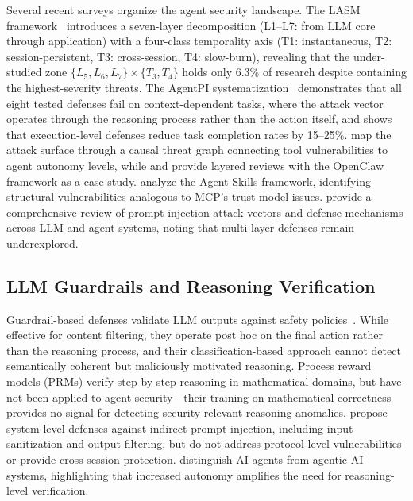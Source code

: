 Several recent surveys organize the agent security landscape. The LASM framework~\citep{lasm2026} introduces a seven-layer decomposition (L1--L7: from LLM core through application) with a four-class temporality axis (T1: instantaneous, T2: session-persistent, T3: cross-session, T4: slow-burn), revealing that the under-studied zone $\{L_5, L_6, L_7\} \times \{T_3, T_4\}$ holds only 6.3\% of research despite containing the highest-severity threats. The AgentPI systematization~\citep{agentpi2026} demonstrates that all eight tested defenses fail on context-dependent tasks, where the attack vector operates through the reasoning process rather than the action itself, and shows that execution-level defenses reduce task completion rates by 15--25\%. \citet{agentsok2026} map the attack surface through a causal threat graph connecting tool vulnerabilities to agent autonomy levels, while \citet{openclaw2026} and \citet{matra2026} provide layered reviews with the OpenClaw framework as a case study. \citet{skills2026} analyze the Agent Skills framework, identifying structural vulnerabilities analogous to MCP's trust model issues. \citet{gulyamov2026prompt} provide a comprehensive review of prompt injection attack vectors and defense mechanisms across LLM and agent systems, noting that multi-layer defenses remain underexplored.

\subsection{LLM Guardrails and Reasoning Verification}

Guardrail-based defenses validate LLM outputs against safety policies~\citep{dong2025safeguarding}. While effective for content filtering, they operate post hoc on the final action rather than the reasoning process, and their classification-based approach cannot detect semantically coherent but maliciously motivated reasoning. Process reward models (PRMs) verify step-by-step reasoning in mathematical domains, but have not been applied to agent security---their training on mathematical correctness provides no signal for detecting security-relevant reasoning anomalies. \citet{secureagent2026} propose system-level defenses against indirect prompt injection, including input sanitization and output filtering, but do not address protocol-level vulnerabilities or provide cross-session protection. \citet{sapkota2025agents} distinguish AI agents from agentic AI systems, highlighting that increased autonomy amplifies the need for reasoning-level verification.

